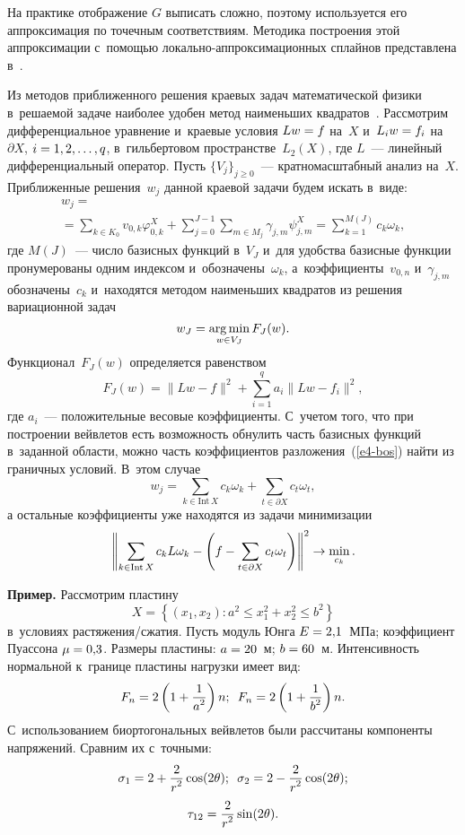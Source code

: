 \begin{multicols}{2}
 
\pagebreak
  
  На практике отображение $G$ выписать слож\-но, поэтому используется его 
аппроксимация по точечным соответствиям. Методика по\-стро\-ения этой 
аппроксимации с~по\-мощью ло\-каль\-но-ап\-прок\-си\-ма\-ци\-он\-ных сплайнов 
пред\-став\-ле\-на в~\cite{7-bos}.
  
  Из методов приближенного решения краевых задач математической физики 
в~ре\-ша\-емой задаче наиболее удобен метод наименьших  
квад\-ра\-тов~\cite{10-bos}. Рассмотрим дифференциальное уравнение и~краевые 
условия $Lw\hm= f$ на~$X$ и~$L_i w\hm= f_i$ на $\partial X$, $i\hm=1,2,\ldots , q$, 
в~гильбертовом пространстве~$L_2(X)$, где $L$~--- линейный 
дифференциальный оператор. Пусть $\{V_j\}_{j\geq 0}$~---  
крат\-но\-мас\-штаб\-ный анализ на~$X$. При\-бли\-жен\-ные решения~$w_j$ данной 
кра\-евой задачи будем искать в~виде:
  \begin{multline}
  w_j={}\\
  \!{}= \!\!\sum\limits_{k\in K_0} \!v_{0,k} \varphi^X_{0,k} +\sum\limits_{j=0}^{J-1} 
\sum\limits_{m\in M_j} \!\gamma_{j,m} \psi^X_{j,m} = \!\sum\limits_{k=1}^{M(J)}\! c_k 
\omega_k,\!\!
  \label{e4-bos}
  \end{multline}
где $M(J)$~--- число базисных функций в~$V_J$ и~для удобства базисные 
функции пронумерованы одним индексом и~обозначены~$\omega_k$, 
а~коэффициенты~$v_{0,n}$ и~$\gamma_{j,m}$ обозначены~$c_k$ и~находятся 
методом наименьших квад\-ра\-тов из решения вариационной задач 
$$
w_J=\mathop{\mathrm{arg}\,\mathrm{min}}\limits_{w\in V_J} F_J(w).
$$
 Функционал~$F_J(w)$ определяется 
равенством 
$$
F_J(w)= \| Lw - f\|^2 + \sum\limits^q_{i=1} a_i \| Lw-  f_i\|^2,
$$
где $a_i$~--- положительные весовые коэффициенты. С~учетом того, что при 
построении вейвлетов есть воз\-мож\-ность обнулить часть базисных функций 
в~заданной об\-ласти, мож\-но часть коэффициентов разложения~(\ref{e4-bos}) найти 
из граничных условий. В~этом случае 
$$
w_j= \sum\limits_{k\in \mathrm{Int}\,X} c_k \omega_k + \sum\limits_{t\in \partial X} c_t \omega_t,
$$
 а остальные 
коэффициенты уже находятся из задачи минимизации 
$$
\left\| \sum\limits_{k\in \mathrm{Int}\,X} 
c_k L\omega_k- \left(f- \sum\limits_{t\in \partial X} c_t \omega_t\right)\right\|^2\hm\to 
\min\limits_{c_k}.
$$
  
  
  \smallskip
  
  \noindent
  \textbf{Пример.} Рассмотрим плас\-ти\-ну 
  $$
  X= \left\{ (x_1, x_2): a^2\leq  x_1^2+ x_2^2\leq b^2\right\}
$$ 
в~условиях рас\-тя\-же\-ния/сжа\-тия. Пусть 
модуль Юнга $E\hm= 2{,}1$~МПа; коэффициент Пуассона $\mu\hm= 0{,}3$. 
Размеры пластины: $a\hm= 20$~м; $b\hm=60$~м. Ин\-тен\-сив\-ность нормальной 
к~границе плас\-ти\-ны нагрузки имеет вид: 
$$
F_n= 2\left(1+ \displaystyle\frac{\displaystyle 1\mathstrut}{\displaystyle a^2\mathstrut}\right)n;\enskip F_n=2\left(1+ \displaystyle\frac{\displaystyle 1\mathstrut}{\displaystyle b^2\mathstrut}\right)n.
$$
 С~использованием биортогональных вейв\-ле\-тов были 
рассчитаны компоненты на\-пря\-же\-ний. Сравним их с~точными: 
\begin{gather*}
\sigma_1=2+ \displaystyle\frac{\displaystyle 2\mathstrut}{\displaystyle r^2\mathstrut}\cos(2\theta);\enskip \sigma_2= 2- \displaystyle\frac{\displaystyle 2\mathstrut}{\displaystyle r^2\mathstrut}\cos(2\theta);\\ 
\tau_{12}= \displaystyle\frac{\displaystyle 2\mathstrut}{\displaystyle r^2\mathstrut}\sin(2\theta).
\end{gather*}
  

\end{multicols}
